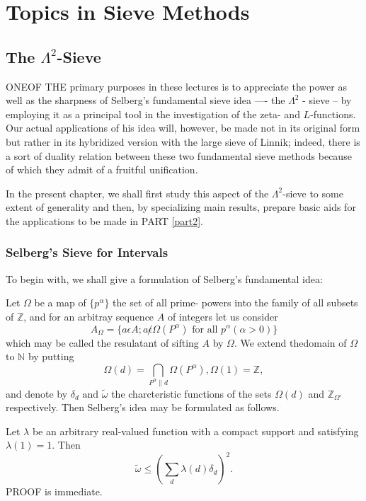 \part{Topics in Sieve Methods}\label{part1}

\chapter{The $\Lambda^{2}$-Sieve}\label{part1-chap1}

ONE\pageoriginale OF THE primary purposes in these lectures is to appreciate the
power as well as the sharpness of Selberg's fundamental sieve idea
---- the $\Lambda^{2}$ - sieve -- by employing it as a principal tool
in the investigation of the zeta- and  $L$-functions. Our actual
applications of his idea will, however, be made not in its original
form but rather in its hybridized version with the large sieve of
Linnik; indeed, there is a sort of duality relation between these two
fundamental sieve methods because of which they admit of a fruitful
unification. 

In the present chapter, we shall first study this aspect of the
$\Lambda^{2}$-sieve to some extent of generality and then, by
specializing main results, prepare basic aids for the applications to
be made in PART \ref{part2}. 

\section{Selberg's Sieve for Intervals}\label{part1-chap1:sec1.1}%

To begin with, we shall give a formulation of Selberg's fundamental idea:

Let $\Omega$ be a map of $\{p^{\alpha}\}$ the set of all prime- powers
into the family of all subsets of $\mathbb{Z}$, and for an arbitray
sequence $A$ of integers let us consider 
$$
A_{\Omega} = \{a \epsilon A; a \not\epsilon \Omega (P^{\alpha})
\text{ for all } p^{\alpha} (\alpha > 0)\} 
$$
which may be called the resulatant of sifting $A$ by $\Omega$. We extend
the\pageoriginale domain of $\Omega$ to $\mathbb{N}$ by putting
$$
\Omega(d) = \bigcap_{P^{\alpha}\| d} \Omega(P^{\alpha}), \Omega(1) = \mathbb{Z},
$$
and denote by $\delta_{d} \text{ and } \tilde{\omega}$ the
charcteristic functions of the sets $\Omega(d)$ and\break
$\mathbb{Z}_{\Omega'}$ respectively. Then Selberg's idea may be
formulated as follows. 

\begin{theorem}\label{part1-chap1:sec1.1:thm1}%
  Let $\lambda$ be an arbitrary real-valued function with a
  compact support and satisfying $\lambda(1) = 1$. Then 
  $$
  \tilde{\omega} \leq \left(\sum_{d} \lambda (d) \delta_{d}\right)^{2}.
  $$
  PROOF is immediate.
\end{theorem}

